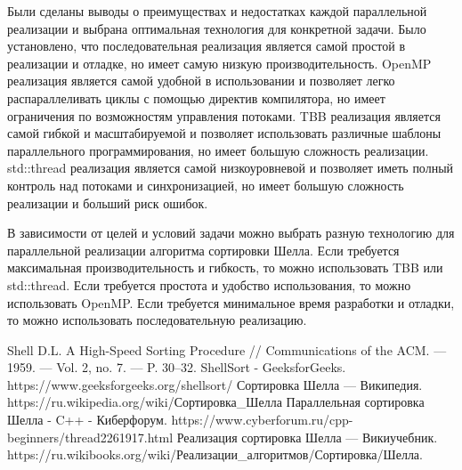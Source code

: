 \documentclass{article}
\begin{document}
Были сделаны выводы о преимуществах и недостатках каждой параллельной реализации и выбрана оптимальная технология для конкретной задачи. Было установлено, что последовательная реализация является самой простой в реализации и отладке, но имеет самую низкую производительность. OpenMP реализация является самой удобной в использовании и позволяет легко распараллеливать циклы с помощью директив компилятора, но имеет ограничения по возможностям управления потоками. TBB реализация является самой гибкой и масштабируемой и позволяет использовать различные шаблоны параллельного программирования, но имеет большую сложность реализации. std::thread реализация является самой низкоуровневой и позволяет иметь полный контроль над потоками и синхронизацией, но имеет большую сложность реализации и больший риск ошибок.

В зависимости от целей и условий задачи можно выбрать разную технологию для параллельной реализации алгоритма сортировки Шелла. Если требуется максимальная производительность и гибкость, то можно использовать TBB или std::thread. Если требуется простота и удобство использования, то можно использовать OpenMP. Если требуется минимальное время разработки и отладки, то можно использовать последовательную реализацию.

\newpage
\begin{thebibliography}{9}  Shell D.L. A High-Speed Sorting Procedure // Communications of the ACM. — 1959. — Vol. 2, no. 7. — P. 30–32.  ShellSort - GeeksforGeeks. https://www.geeksforgeeks.org/shellsort/  Сортировка Шелла — Википедия. https://ru.wikipedia.org/wiki/Сортировка\_Шелла   Параллельная сортировка Шелла - C++ - Киберфорум. https://www.cyberforum.ru/cpp-beginners/thread2261917.html  Реализация сортировка Шелла — Викиучебник. https://ru.wikibooks.org/wiki/Реализации\_алгоритмов/Сортировка/Шелла.\end{thebibliography}

\newpage
\end{document}
